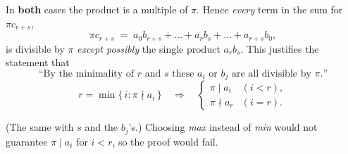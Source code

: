\documentclass[12pt]{article}
\theoremstyle{definition} %
\theoremstyle{plain} %
\begin{document}
In \textbf{both} cases the product is a multiple of $\pi$.
Hence \emph{every} term in the sum for $\pi c_{r+s}$,
\[
  \pi c_{r+s}
  \;=\;
  a_0 b_{r+s}
  +\dots+
  a_r b_s
  +\dots+
  a_{r+s} b_0,
\]
is divisible by $\pi$ \emph{except possibly} the single product
$a_r b_s$.
This justifies the statement that
\[
  \text{“By the minimality of $r$ and $s$ these $a_i$ or $b_j$ are all
  divisible by $\pi$.”}
\]
\[
  r=\min\{\,i : \pi\nmid a_i\,\}
  \quad\Longrightarrow\quad
  \begin{cases}
    \pi\mid a_i & (i<r),\\
    \pi\nmid a_r & (i=r).
  \end{cases}
\]

(The same with \(s\) and the $b_j$’s.)
Choosing \emph{max} instead of \emph{min} would not guarantee
$\pi\mid a_i$ for $i<r$, so the proof would fail.
\end{document}
